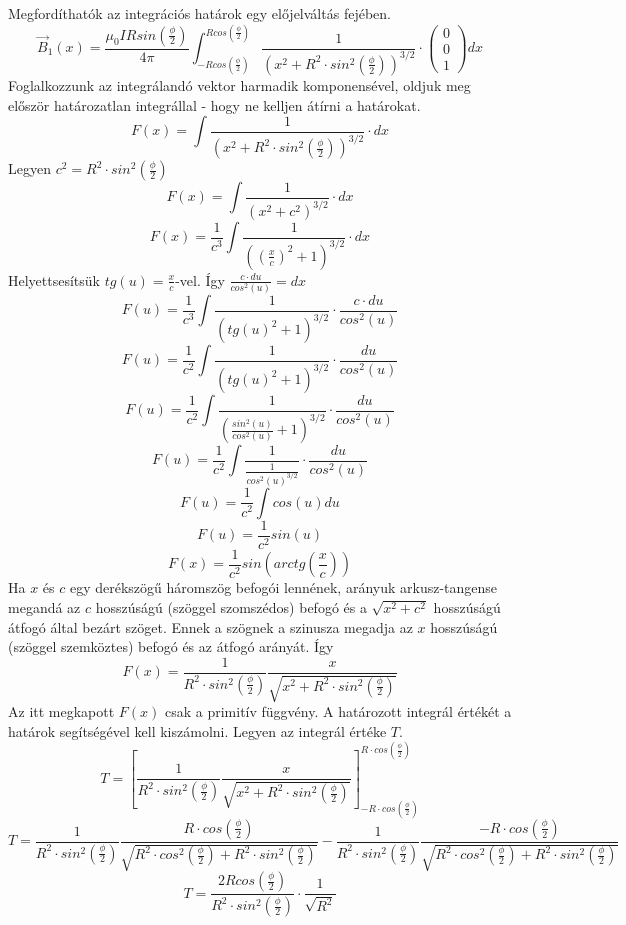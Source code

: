 \documentclass[11pt,a4paper,openany,leqno]{article}
\begin{document}
\indent
Megfordíthatók az integrációs határok egy előjelváltás fejében.
$$ \vec{B}_1(x) = \frac{\mu_0 I R sin(\frac{\phi}{2})}{4\pi}\int_{-R cos(\frac{\phi}{2})}^{Rcos(\frac{\phi}{2})} \frac{1}{(x^2 + R^2 \cdot sin^2 (\frac{\phi}{2}))^{3/2}}\cdot \begin{pmatrix} 0 \\ 0 \\ 1 \end{pmatrix} dx $$
\indent
Foglalkozzunk az integrálandó vektor harmadik komponensével, oldjuk meg először határozatlan integrállal - hogy ne kelljen átírni a határokat.
$$ F(x) = \int \frac{1}{(x^2 + R^2 \cdot sin^2 (\frac{\phi}{2}))^{3/2}}\cdot dx $$
\indent
Legyen $ c^2 = R^2 \cdot sin^2 (\frac{\phi}{2}) $
$$ F(x) = \int \frac{1}{(x^2 + c^2)^{3/2}}\cdot dx $$
$$ F(x) = \frac{1}{c^3}\int \frac{1}{((\frac{x}{c})^2 + 1)^{3/2}}\cdot dx $$
\indent
Helyettsesítsük $tg(u) = \frac{x}{c}$-vel. Így $\frac{c\cdot du}{cos^2(u)} = dx $
$$ F(u) = \frac{1}{c^3}\int \frac{1}{(tg(u)^2 + 1)^{3/2}}\cdot \frac{c\cdot du}{cos^2(u)} $$
$$ F(u) = \frac{1}{c^2}\int \frac{1}{(tg(u)^2 + 1)^{3/2}}\cdot \frac{du}{ cos^2(u)} $$
$$ F(u) = \frac{1}{c^2}\int \frac{1}{(\frac{sin^2(u)}{cos^2(u)} + 1)^{3/2}}\cdot \frac{du}{cos^2(u)} $$
$$ F(u) = \frac{1}{c^2}\int \frac{1}{\frac{1}{cos^2(u)^{3/2}}}\cdot \frac{du}{cos^2(u)} $$
$$ F(u) = \frac{1}{c^2}\int cos(u) du $$
$$ F(u) = \frac{1}{c^2} sin(u) $$
$$ F(x) = \frac{1}{c^2} sin(arctg(\frac{x}{c})) $$
\indent
Ha $x$ és $c$ egy derékszögű háromszög befogói lennének, arányuk arkusz-tangense megandá az $c$ hosszúságú (szöggel szomszédos) befogó és a $\sqrt{x^2 + c^2}$ hosszúságú átfogó által bezárt szöget. Ennek a szögnek a szinusza megadja az $x$ hosszúságú (szöggel szemköztes) befogó és az átfogó arányát. Így
$$ F(x) = \frac{1}{R^2 \cdot sin^2(\frac{\phi}{2})} \frac{x}{\sqrt{x^2 + R^2 \cdot sin^2(\frac{\phi}{2})}} $$
\indent
Az itt megkapott $F(x)$ csak a primitív függvény. A határozott integrál értékét a határok segítségével kell kiszámolni. Legyen az integrál értéke $T$.
$$ T = [{\frac{1}{R^2 \cdot sin^2(\frac{\phi}{2})} \frac{x}{\sqrt{x^2 + R^2 \cdot sin^2(\frac{\phi}{2})}}}]_{-R\cdot cos(\frac{\phi}{2})}^{R \cdot cos(\frac{\phi}{2})} $$
$$T = \frac{1}{R^2 \cdot sin^2(\frac{\phi}{2})} \frac{R \cdot cos(\frac{\phi}{2})}{\sqrt{R^2 \cdot cos^2(\frac{\phi}{2}) + R^2 \cdot sin^2(\frac{\phi}{2})}} - \frac{1}{R^2 \cdot sin^2(\frac{\phi}{2})} \frac{- R \cdot cos(\frac{\phi}{2})}{\sqrt{R^2 \cdot cos^2(\frac{\phi}{2}) + R^2 \cdot sin^2(\frac{\phi}{2})}}$$
$$ T = \frac{2R cos(\frac{\phi}{2})}{R^2 \cdot sin^2(\frac{\phi}{2})}\cdot \frac{1}{\sqrt{R^2}} $$
\end{document}
